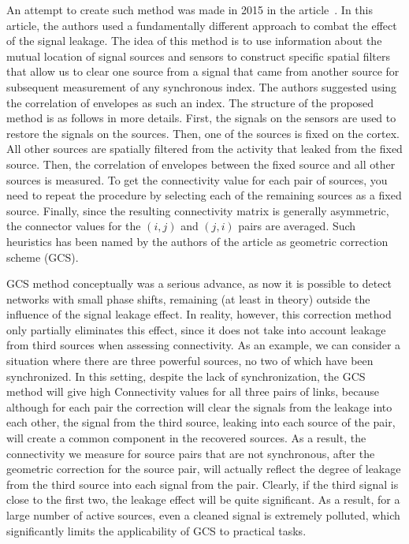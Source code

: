 An attempt to create such method was made in 2015 in the
article~\cite{Wens2015}. In this article, the authors used a fundamentally
different approach to combat the effect of the signal leakage.  The idea of
this method is to use information about the mutual location of signal sources
and sensors to construct specific spatial filters that allow us to clear one
source from a signal that came from another source for subsequent measurement
of any synchronous index. The authors suggested using the correlation of
envelopes as such an index. The structure of the proposed method is as follows
in more details. First, the signals on the sensors are used to restore the
signals on the sources.  Then, one of the sources is fixed on the cortex.  All
other sources are spatially filtered from the activity that leaked from the
fixed source.  Then, the correlation of envelopes between the fixed source and
all other sources is measured.  To get the connectivity value for each pair of
sources, you need to repeat the procedure by selecting each of the remaining
sources as a fixed source.  Finally, since the resulting connectivity matrix is
generally asymmetric, the connector values for the $(i,j)$ and $(j,i)$ pairs
are averaged. Such heuristics has been named by the authors of the article as
geometric correction scheme (GCS).

GCS method conceptually was a serious advance, as now it is possible to detect
networks with small phase shifts, remaining (at least in theory) outside the
influence of the signal leakage effect.  In reality, however, this correction
method only partially eliminates this effect, since it does not take into
account leakage from third sources when assessing connectivity. As an example,
we can consider a situation where there are three powerful sources, no two of
which have been synchronized.  In this setting, despite the lack of
synchronization, the GCS method will give high Connectivity values for all
three pairs of links, because although for each pair the correction will clear
the signals from the leakage into each other, the signal from the third source,
leaking into each source of the pair, will create a common component in the
recovered sources.  As a result, the connectivity we measure for source pairs
that are not synchronous, after the geometric correction for the source pair,
will actually reflect the degree of leakage from the third source into each
signal from the pair. Clearly, if the third signal is close to the first two,
the leakage effect will be quite significant. As a result, for a large number
of active sources, even a cleaned signal is extremely polluted, which
significantly limits the applicability of GCS to practical tasks.



